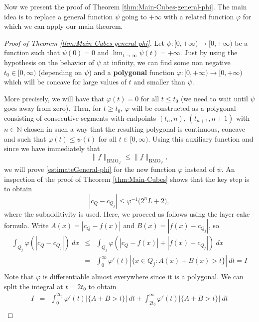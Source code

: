 \documentclass[11pt,a4paper]{amsart}
\theoremstyle{definition}
\theoremstyle{remark}
\numberwithin{equation}{section}
\DeclareMathOperator{\BMO}{BMO}
\numberwithin{equation}{section}
\begin{document}
Now we present the proof of Theorem \ref{thm:Main-Cubes-general-phi}.  The main idea is to replace a general function $\psi$ going to $+\infty$ with a related function $\varphi$ for which we can apply our main theorem.


\begin{proof}[Proof of Theorem \ref{thm:Main-Cubes-general-phi}]

Let $\psi:[0,+\infty)\to [0,+\infty)$ be a function such that $\psi(0)=0$ and $\lim_{t\to\infty}\psi(t)=+\infty$. Just by using the hypothesis on the behavior of $\psi$ at infinity, we can find some non negative $t_0\in [0,\infty)$ (depending on $\psi$) and a \textbf{polygonal} function $\varphi: [0,+\infty)\to [0,+\infty)$ which will be concave for large values of $t$ and smaller than $\psi$. 

More precisely, we will have that $\varphi(t)=0$ for all $t\le t_0$ (we need to wait until $\psi$ goes away from zero). Then, for $t\ge t_0$, $\varphi$ will be constructed as a polygonal consisting of consecutive segments with endpoints $(t_n,n)$, $(t_{n+1},n+1)$ with $n\in\mathbb{N}$ chosen in such a way that the resulting polygonal is continuous, concave and such that $\varphi(t)\le \psi(t)$ for all $t\in [0,\infty)$.
Using this auxiliary function and since we have immediately that
\begin{equation*}
\|f\|_{\BMO_\varphi} \le \|f\|_{\BMO_{\psi}},
\end{equation*}
%
we will prove \eqref{estimateGeneral-phi} for the new function $\varphi$ instead of $\psi$.
An inspection of the proof of Theorem \ref{thm:Main-Cubes} shows that the key step is to obtain 
\begin{equation*}
|c_Q-c_{Q_j}| \le \varphi^{-1} \big( 2^n L +2 \big),
\end{equation*}
where the subadditivity is used. Here, we proceed as follows using the layer cake formula. Write $A(x)=|c_Q-f(x)|$ and $B(x)=|f(x)-c_{Q_j}|$, so 
\begin{eqnarray*}
\int_{Q_j} \varphi(|c_Q-c_{Q_j}|) \ dx& \le &
\int_{Q_j} \varphi(|c_Q-f(x)|+|f(x)-c_{Q_j}|)\ dx\\
& = & \int_0^\infty \varphi'(t)|\{x\in Q_j: A(x)+B(x)>t\}|\ dt=I\\
\end{eqnarray*}
Note that $\varphi$ is differentiable almost everywhere since it is a polygonal. We can split the integral at $t=2t_0$ to obtain
\begin{eqnarray*}
I& = &
\int_{0}^{2t_0} \varphi'(t)|\{ A+B>t\}|\ dt+\int_{2t_0}^\infty \varphi'(t)|\{ A+B>t\}|\ dt\\

\end{eqnarray*}
\end{proof}
\end{document}
